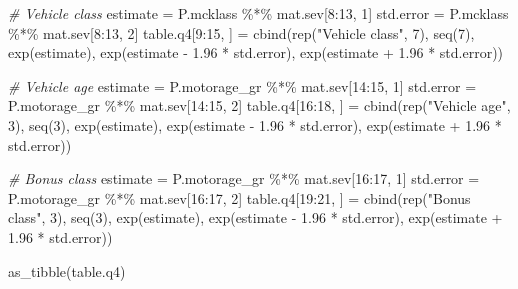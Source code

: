 \documentclass[
]{article}
\newenvironment{Shaded}{\begin{snugshade}}{\end{snugshade}}
\newcommand{\CommentTok}[1]{\textcolor[rgb]{0.56,0.35,0.01}{\textit{#1}}}
\newcommand{\DecValTok}[1]{\textcolor[rgb]{0.00,0.00,0.81}{#1}}
\newcommand{\FloatTok}[1]{\textcolor[rgb]{0.00,0.00,0.81}{#1}}
\newcommand{\FunctionTok}[1]{\textcolor[rgb]{0.00,0.00,0.00}{#1}}
\newcommand{\NormalTok}[1]{#1}
\newcommand{\OtherTok}[1]{\textcolor[rgb]{0.56,0.35,0.01}{#1}}
\newcommand{\SpecialCharTok}[1]{\textcolor[rgb]{0.00,0.00,0.00}{#1}}
\newcommand{\StringTok}[1]{\textcolor[rgb]{0.31,0.60,0.02}{#1}}
\begin{document}
\begin{Shaded}
\begin{Highlighting}[]
\CommentTok{\# Vehicle class}
\NormalTok{estimate }\OtherTok{=}\NormalTok{ P.mcklass }\SpecialCharTok{\%*\%}\NormalTok{ mat.sev[}\DecValTok{8}\SpecialCharTok{:}\DecValTok{13}\NormalTok{, }\DecValTok{1}\NormalTok{]}
\NormalTok{std.error }\OtherTok{=}\NormalTok{ P.mcklass }\SpecialCharTok{\%*\%}\NormalTok{ mat.sev[}\DecValTok{8}\SpecialCharTok{:}\DecValTok{13}\NormalTok{, }\DecValTok{2}\NormalTok{]}
\NormalTok{table.q4[}\DecValTok{9}\SpecialCharTok{:}\DecValTok{15}\NormalTok{, ] }\OtherTok{=} \FunctionTok{cbind}\NormalTok{(}\FunctionTok{rep}\NormalTok{(}\StringTok{"Vehicle class"}\NormalTok{, }\DecValTok{7}\NormalTok{), }\FunctionTok{seq}\NormalTok{(}\DecValTok{7}\NormalTok{), }\FunctionTok{exp}\NormalTok{(estimate), }\FunctionTok{exp}\NormalTok{(estimate }\SpecialCharTok{{-}} \FloatTok{1.96} \SpecialCharTok{*}\NormalTok{ std.error), }\FunctionTok{exp}\NormalTok{(estimate }\SpecialCharTok{+} \FloatTok{1.96} \SpecialCharTok{*}\NormalTok{ std.error))}

\CommentTok{\# Vehicle age}
\NormalTok{estimate }\OtherTok{=}\NormalTok{ P.motorage\_gr }\SpecialCharTok{\%*\%}\NormalTok{ mat.sev[}\DecValTok{14}\SpecialCharTok{:}\DecValTok{15}\NormalTok{, }\DecValTok{1}\NormalTok{]}
\NormalTok{std.error }\OtherTok{=}\NormalTok{ P.motorage\_gr }\SpecialCharTok{\%*\%}\NormalTok{ mat.sev[}\DecValTok{14}\SpecialCharTok{:}\DecValTok{15}\NormalTok{, }\DecValTok{2}\NormalTok{]}
\NormalTok{table.q4[}\DecValTok{16}\SpecialCharTok{:}\DecValTok{18}\NormalTok{, ] }\OtherTok{=} \FunctionTok{cbind}\NormalTok{(}\FunctionTok{rep}\NormalTok{(}\StringTok{"Vehicle age"}\NormalTok{, }\DecValTok{3}\NormalTok{), }\FunctionTok{seq}\NormalTok{(}\DecValTok{3}\NormalTok{), }\FunctionTok{exp}\NormalTok{(estimate), }\FunctionTok{exp}\NormalTok{(estimate }\SpecialCharTok{{-}} \FloatTok{1.96} \SpecialCharTok{*}\NormalTok{ std.error), }\FunctionTok{exp}\NormalTok{(estimate }\SpecialCharTok{+} \FloatTok{1.96} \SpecialCharTok{*}\NormalTok{ std.error))}

\CommentTok{\# Bonus class}
\NormalTok{estimate }\OtherTok{=}\NormalTok{ P.motorage\_gr }\SpecialCharTok{\%*\%}\NormalTok{ mat.sev[}\DecValTok{16}\SpecialCharTok{:}\DecValTok{17}\NormalTok{, }\DecValTok{1}\NormalTok{]}
\NormalTok{std.error }\OtherTok{=}\NormalTok{ P.motorage\_gr }\SpecialCharTok{\%*\%}\NormalTok{ mat.sev[}\DecValTok{16}\SpecialCharTok{:}\DecValTok{17}\NormalTok{, }\DecValTok{2}\NormalTok{]}
\NormalTok{table.q4[}\DecValTok{19}\SpecialCharTok{:}\DecValTok{21}\NormalTok{, ] }\OtherTok{=} \FunctionTok{cbind}\NormalTok{(}\FunctionTok{rep}\NormalTok{(}\StringTok{"Bonus class"}\NormalTok{, }\DecValTok{3}\NormalTok{), }\FunctionTok{seq}\NormalTok{(}\DecValTok{3}\NormalTok{), }\FunctionTok{exp}\NormalTok{(estimate), }\FunctionTok{exp}\NormalTok{(estimate }\SpecialCharTok{{-}} \FloatTok{1.96} \SpecialCharTok{*}\NormalTok{ std.error), }\FunctionTok{exp}\NormalTok{(estimate }\SpecialCharTok{+} \FloatTok{1.96} \SpecialCharTok{*}\NormalTok{ std.error))}

\FunctionTok{as\_tibble}\NormalTok{(table.q4)}
\end{Highlighting}
\end{Shaded}
\end{document}
